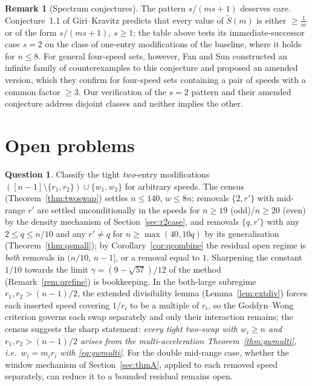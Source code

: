 \documentclass[11pt]{article}
\theoremstyle{definition}
\newtheorem{remark}[theorem]{Remark}
\newtheorem{question}[theorem]{Question}
\begin{document}
\begin{remark}[Spectrum conjectures]\label{rem:spectrumconj}
The pattern $s/(ms{+}1)$ deserves care.  Conjecture~1.1 of
Giri--Kravitz \cite{GiriKravitz2026} predicts that every value of
$\widetilde{S}(m)$ is either $\ge\frac1m$ or of the form
$s/(ms{+}1)$, $s\ge1$; the table above tests its immediate-successor
case $s=2$ on the class of one-entry modifications of the baseline,
where it holds for $n\le8$.  For general four-speed sets, however,
Fan and Sun \cite{FanSun2026} constructed an infinite family of
counterexamples to this conjecture and proposed an amended version,
which they confirm for four-speed sets containing a pair of speeds with
a common factor $\ge3$.  Our verification of the $s=2$ pattern and
their amended conjecture address disjoint classes and neither implies
the other.
\end{remark}

\section{Open problems}

\begin{question}\label{q:twoswap}
Classify the tight \emph{two}-entry modifications
$([n-1]\setminus\{r_1,r_2\})\cup\{w_1,w_2\}$ for arbitrary speeds.  The
census (Theorem~\ref{thm:twoswap}) settles $n\le140$, $w\le8n$; removals
$\{2,r'\}$ with mid-range $r'$ are settled unconditionally in the speeds
for $n\ge19$ (odd)/$n\ge20$ (even) by the density mechanism of
Section~\ref{sec:r2case}, and removals $\{q,r'\}$ with any
$2\le q\le n/10$ and any $r'\ne q$ for $n\ge\max(40,10q)$ by its
generalisation (Theorem~\ref{thm:qsmall}); by
Corollary~\ref{cor:qcombine} the residual open regime is \emph{both}
removals in $(n/10,\,n-1]$, or a removal equal to $1$.  Sharpening the
constant $1/10$ towards the limit $\gamma=(9-\sqrt{57})/12$ of the
method (Remark~\ref{rem:qrefine}) is bookkeeping.  In the both-large
subregime $r_1,r_2>(n-1)/2$, the extended divisibility lemma
(Lemma~\ref{lem:extdiv}) forces each inserted speed covering $1/r_i$ to
be a multiple of $r_i$, so the Goddyn--Wong criterion governs each swap
separately and only their interaction remains; the census suggests the
sharp statement: \emph{every tight two-swap with $w_i\ge n$ and
$r_1,r_2>(n-1)/2$ arises from the multi-acceleration
Theorem~\ref{thm:gwmulti}, i.e.\ $w_i=m_ir_i$ with
\eqref{eq:gwmulti}}.  For the double
mid-range case, whether the window mechanism of Section~\ref{sec:thmA},
applied to each removed speed separately, can reduce it to a bounded
residual remains open.
\end{question}
\end{document}
